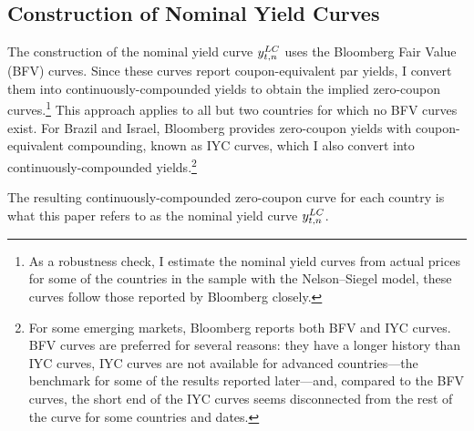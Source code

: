 {%


\subsection{Construction of Nominal Yield Curves} \label{sec:YCnom}
\iftoggle{toclinks}{\gototoc}{} %

The construction of the nominal yield curve \(y_{t,n} ^{LC}\) uses the Bloomberg Fair Value (BFV) curves.
Since these curves report coupon-equivalent par yields, I convert them into continuously-compounded yields
\citep[see][]{GSW:2007} to obtain the implied zero-coupon curves.\footnote{As a robustness check, I estimate the nominal yield curves from actual prices for some of the countries in the sample with the Nelson--Siegel model, these curves follow those reported by Bloomberg closely.} %
This approach applies to all but two countries for which no BFV curves exist.
For Brazil and Israel, Bloomberg provides zero-coupon yields with coupon-equivalent compounding, known as IYC curves, which I also convert into continuously-compounded yields.\footnote{ For some emerging markets, Bloomberg reports both BFV and IYC curves. BFV curves are preferred for several reasons: they have a longer history than IYC curves, IYC curves are not available for advanced countries---the benchmark for some of the results reported later---and, compared to the BFV curves, the short end of the IYC curves seems disconnected from the rest of the curve for some countries and dates.} 

The resulting continuously-compounded zero-coupon curve for each country is what this paper refers to as the nominal yield curve \(y_{t,n} ^{LC}\).

}
